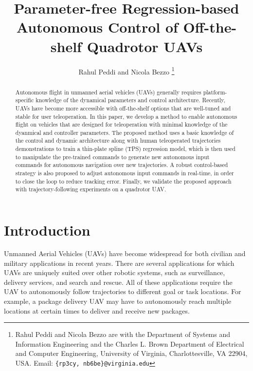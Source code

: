 \documentclass[letterpaper, 10 pt, conference]{ieeeconf}  %
\newcommand\NB[1]{$\spadesuit$\footnote{NB: #1}}
\begin{document}
\title{\LARGE \bf
Parameter-free Regression-based Autonomous Control of Off-the-shelf Quadrotor UAVs
}


\author{Rahul Peddi and Nicola Bezzo%
\thanks{Rahul Peddi and Nicola Bezzo are with the Department of Systems and Information Engineering and the Charles L. Brown Department of Electrical and Computer Engineering, University of Virginia, Charlottesville, VA 22904, USA. Email: {\tt \{rp3cy, nb6be\}@virginia.edu}}}



\maketitle
\thispagestyle{empty}
\pagestyle{empty}


\begin{abstract}
Autonomous flight in unmanned aerial vehicles (UAVs) generally requires platform-specific knowledge of the dynamical parameters and control architecture. Recently, UAVs have become more accessible with off-the-shelf options that are well-tuned and stable for user teleoperation. In this paper, we develop a method to enable autonomous flight on vehicles that are designed for teleoperation with minimal knowledge of the dyanmical and controller parameters. The proposed method uses a basic knowledge of the control and dynamic architecture along with human teleoperated trajectories demonstrations to train a thin-plate spline (TPS) regression model, which is then used to manipulate the pre-trained commands to generate new autonomous input commands for autonomous navigation over new trajectories. A robust control-based strategy is also proposed to adjust autonomous input commands in real-time, in order to close the loop to reduce tracking error. Finally, we validate the proposed approach with trajectory-following experiments on a quadrotor UAV.

\end{abstract}


\section{Introduction}
Unmanned Aerial Vehicles (UAVs) have become widespread for both civilian and military applications in recent years. There are several applications for which UAVs are uniquely suited over other robotic systems, such as surveillance, delivery services, and search and rescue. All of these applications require the UAV to autonomously follow trajectories to different goal or task locations. For example, a package delivery UAV may have to autonomously reach multiple locations at certain times to deliver and receive new packages. 
\end{document}
